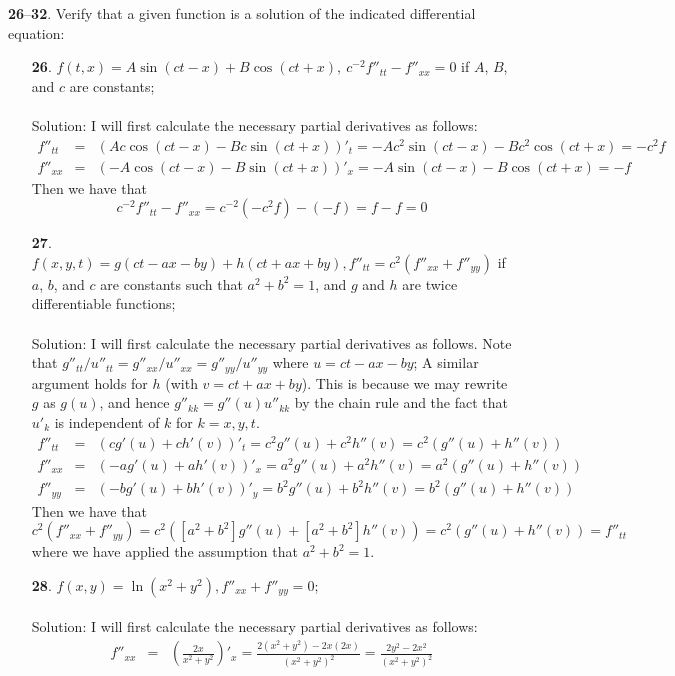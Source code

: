 \documentclass[12pt]{amsbook}
\begin{document}
\noindent
{\small {\bf 26}--{\bf 32}}. Verify that a given function is a solution of the indicated differential
equation:
\begin{enumerate}
\item[{\small\bf 26}.] $f(t,x)=A\sin(ct-x)+B\cos(ct+x), \ c^{-2}f''_{tt}-f''_{xx}=0$ if $A$, $B$, and $c$ are constants;
\\
\\
{\sc Solution}: I will first calculate the necessary partial derivatives as follows:
\begin{eqnarray*}
f''_{tt}&=&(Ac\cos(ct-x)-Bc\sin(ct+x))'_t=-Ac^2\sin(ct-x)-Bc^2\cos(ct+x)=-c^2f \\
f''_{xx}&=&(-A\cos(ct-x)-B\sin(ct+x))'_x=-A\sin(ct-x)-B\cos(ct+x)=-f
\end{eqnarray*}
Then we have that
$$c^{-2}f''_{tt}-f''_{xx}=c^{-2}(-c^2f)-(-f)=f-f=0$$
\item[{\small\bf 27}.] $f(x,y,t)=g(ct-ax-by)+h(ct+ax+by), f''_{tt}=c^2(f''_{xx}+f''_{yy})$ if $a$, $b$, and $c$ are constants such that $a^2+b^2=1$, and $g$ and $h$ are twice differentiable functions;
\\
\\
{\sc Solution}: I will first calculate the necessary partial derivatives as follows. Note that $g''_{tt}/u''_{tt}=g''_{xx}/u''_{xx}=g''_{yy}/u''_{yy}$ where $u=ct-ax-by$; A similar argument holds for $h$ (with $v=ct+ax+by$). This is because we may rewrite $g$ as $g(u)$, and hence $g''_{kk}=g''(u)u''_{kk}$ by the chain rule and the fact that $u'_k$ is independent of $k$ for $k=x,y,t$. 
\begin{eqnarray*}
f''_{tt}&=&(cg'(u)+ch'(v))'_t=c^2g''(u)+c^2h''(v)=c^2(g''(u)+h''(v)) \\
f''_{xx}&=&(-ag'(u)+ah'(v))'_x=a^2g''(u)+a^2h''(v)=a^2(g''(u)+h''(v)) \\
f''_{yy}&=&(-bg'(u)+bh'(v))'_y=b^2g''(u)+b^2h''(v)=b^2(g''(u)+h''(v))
\end{eqnarray*}
Then we have that
$$c^{2}(f''_{xx}+f''_{yy})=c^2([a^2+b^2]g''(u)+[a^2+b^2]h''(v))=c^2(g''(u)+h''(v))=f''_{tt}$$
where we have applied the assumption that $a^2+b^2=1$.
\\
\item[{\small\bf 28}.] $f(x,y)=\ln(x^2+y^2), f''_{xx}+f''_{yy}=0$;
\\
\\
{\sc Solution}: I will first calculate the necessary partial derivatives as follows:
\begin{eqnarray*}
f''_{xx}&=&(\frac{2x}{x^2+y^2})'_x=\frac{2(x^2+y^2)-2x(2x)}{(x^2+y^2)^2}=\frac{2y^2-2x^2}{(x^2+y^2)^2} \\

\end{eqnarray*}
\end{enumerate}
\end{document}
